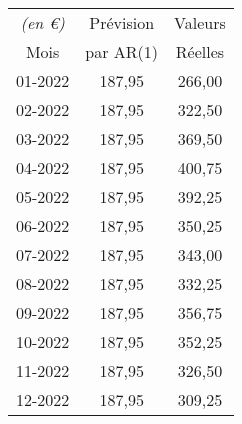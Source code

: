 \begin{tabular}{ccc}
\toprule
\textit{(en \euro)} & Prévision & Valeurs \\
Mois  & par AR(1) & Réelles \\
\midrule
01-2022 & 187,95 & 266,00\\
02-2022 & 187,95 & 322,50 \\
03-2022 & 187,95 & 369,50 \\
04-2022 & 187,95 & 400,75 \\
05-2022 & 187,95 & 392,25 \\
06-2022 & 187,95 & 350,25 \\
07-2022 & 187,95 & 343,00\\
08-2022 & 187,95 & 332,25 \\
09-2022 & 187,95 & 356,75 \\
10-2022 & 187,95 & 352,25 \\
11-2022 & 187,95 & 326,50 \\
12-2022 & 187,95 & 309,25 \\
\bottomrule
\end{tabular}
